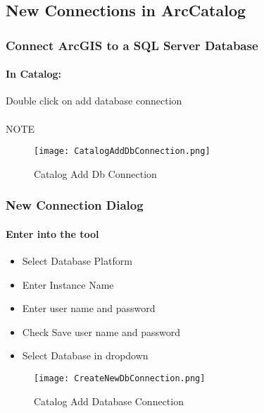\documentclass[class=article , crop=false, titlepage, twoside, multi={itemize, figure, verbatim}, float=false]{standalone}
\title{}  %
\begin{document}


\ifstandalone
\maketitle %
\tableofcontents %
\clearpage
\fi

\subsection{New Connections in ArcCatalog}
\medskip
\subsubsection[Connect ArcGIS to a SQL Server Database]{\Large Connect ArcGIS to a SQL Server Database}
\paragraph*{In Catalog: \texorpdfstring{\\}{}}
Double click on add database connection
\paragraph*{}NOTE
\begin{figure}[h!]
\centering
    \texttt{[image: CatalogAddDbConnection.png]}
\caption{Catalog Add Db Connection}
\end{figure}
\clearpage
\subsubsection[New Connection Dialog]{\Large New Connection Dialog}
\paragraph*{Enter into the tool \texorpdfstring{\\}{}}
\begin{itemize}
  \item {Select Database Platform}
  \item {Enter Instance Name}
  \item {Enter user name and password}
  \item {Check Save user name and password}
  \item {Select Database in dropdown}\\
\end{itemize}
\begin{figure}[h!]
\centering
    \texttt{[image: CreateNewDbConnection.png]}
\caption{Catalog Add Database Connection}
\end{figure}
\clearpage
\end{document}
